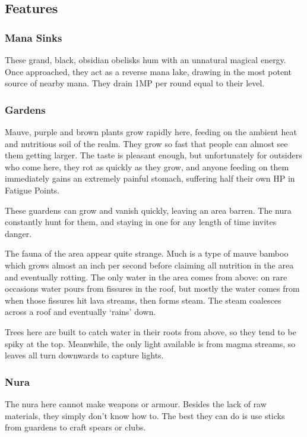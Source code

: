 \begin{multicols}{2}
\subsection{Features}
\subsubsection{Mana Sinks}
These grand, black, obsidian obelisks hum with an unnatural magical energy.  Once approached, they act as a reverse mana lake, drawing in the most potent source of nearby mana.  They drain 1MP per round equal to their level.

\subsubsection{Gardens}
Mauve, purple and brown plants grow rapidly here, feeding on the ambient heat and nutritious soil of the realm.  They grow so fast that people can almost see them getting larger.  The taste is pleasant enough, but unfortunately for outsiders who come here, they rot as quickly as they grow, and anyone feeding on them immediately gains an extremely painful stomach, suffering half their own HP in Fatigue Points.

These guardens can grow and vanish quickly, leaving an area barren.  The nura constantly hunt for them, and staying in one for any length of time invites danger.

The fauna of the area appear quite strange. Much is a type of mauve bamboo which grows almost an inch per second before claiming all nutrition in the area and eventually rotting.  The only water in the area comes from above: on rare occasions water pours from fissures in the roof, but mostly the water comes from when those fissures hit lava streams, then forms steam.  The steam coalesces across a roof and eventually `rains' down.

Trees here are built to catch water in their roots from above, so they tend to be spiky at the top.  Meanwhile, the only light available is from magma streams, so leaves all turn downwards to capture lights.

\subsubsection{Nura}
The nura here cannot make weapons or armour.  Besides the lack of raw materials, they simply don't know how to.  The best they can do is use sticks from guardens to craft spears or clubs.


\end{multicols}
